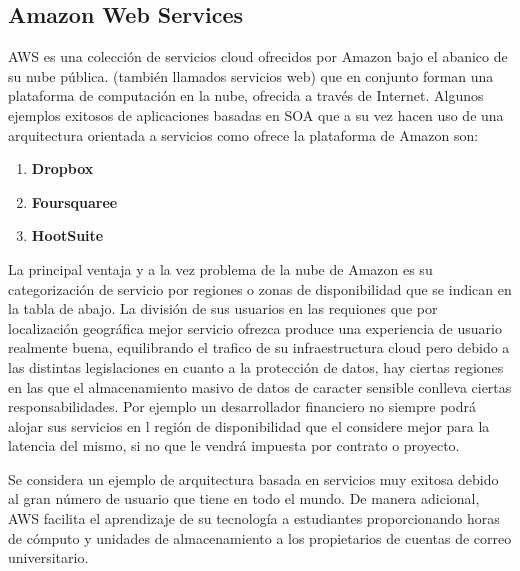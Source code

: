 \documentclass[a4paper,11pt]{book}
\begin{document}
\subsection{Amazon Web Services}

AWS\cite{aws} es una colección de servicios cloud ofrecidos por Amazon bajo el abanico de su nube pública.  (también llamados servicios web) que en conjunto forman una plataforma de computación en la nube, ofrecida a través de Internet. Algunos ejemplos exitosos de aplicaciones basadas en SOA que a su vez hacen uso de una arquitectura orientada a servicios como ofrece la plataforma de Amazon son:

\begin{enumerate}
\item \textbf{Dropbox}
\item \textbf{Foursquaree}
\item \textbf{HootSuite}
\end{enumerate}

La principal ventaja y a la vez problema de la nube de Amazon es su categorización de servicio por regiones o zonas de disponibilidad que se indican en la tabla de abajo. La división de sus usuarios en las requiones que por localización geográfica mejor servicio ofrezca produce una experiencia de usuario realmente buena, equilibrando el trafico de su infraestructura cloud pero debido a las distintas legislaciones en cuanto a la protección de datos, hay ciertas regiones en las que el almacenamiento masivo de datos de caracter sensible conlleva ciertas responsabilidades. Por ejemplo un desarrollador financiero no siempre podrá alojar sus servicios en l región de disponibilidad que el considere mejor para la latencia del mismo, si no que le vendrá impuesta por contrato o proyecto. 

Se considera un ejemplo de arquitectura basada en servicios muy exitosa debido al gran número de usuario que tiene en todo el mundo. De manera adicional, AWS facilita el aprendizaje de su tecnología a estudiantes proporcionando horas de cómputo y unidades de almacenamiento a los propietarios de cuentas de correo universitario. 
\end{document}
